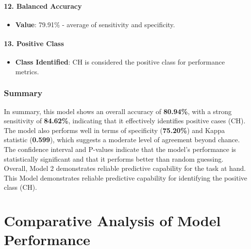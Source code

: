 \documentclass[
]{article}
\providecommand{\tightlist}{%
  \setlength{\itemsep}{0pt}\setlength{\parskip}{0pt}}
\begin{document}
\hypertarget{balanced-accuracy-1}{%
\paragraph{\texorpdfstring{12. \textbf{Balanced
Accuracy}}{12. Balanced Accuracy}}\label{balanced-accuracy-1}}

\begin{itemize}
\tightlist
\item
  \textbf{Value}: 79.91\% - average of sensitivity and specificity.
\end{itemize}

\hypertarget{positive-class-1}{%
\paragraph{\texorpdfstring{13. \textbf{Positive
Class}}{13. Positive Class}}\label{positive-class-1}}

\begin{itemize}
\tightlist
\item
  \textbf{Class Identified}: CH is considered the positive class for
  performance metrics.
\end{itemize}

\hypertarget{summary-1}{%
\subsubsection{Summary}\label{summary-1}}

In summary, this model shows an overall accuracy of \textbf{80.94\%},
with a strong sensitivity of \textbf{84.62\%}, indicating that it
effectively identifies positive cases (CH). The model also performs well
in terms of specificity (\textbf{75.20\%}) and Kappa statistic
(\textbf{0.599}), which suggests a moderate level of agreement beyond
chance. The confidence interval and P-values indicate that the model's
performance is statistically significant and that it performs better
than random guessing. Overall, Model 2 demonstrates reliable predictive
capability for the task at hand. This Model demonstrates reliable
predictive capability for identifying the positive class (CH).

\hypertarget{comparative-analysis-of-model-performance}{%
\section{Comparative Analysis of Model
Performance}\label{comparative-analysis-of-model-performance}}
\end{document}
